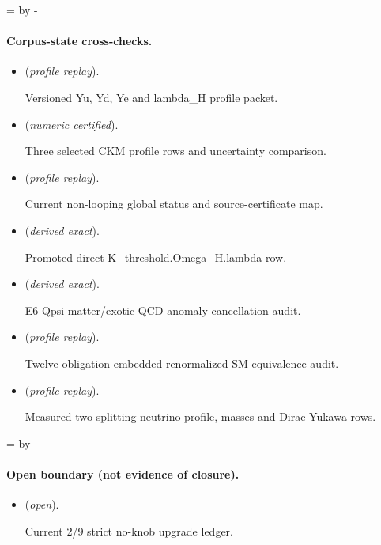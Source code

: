 \documentclass[11pt]{article}
\begin{document}
\par\begingroup{}=\pagegoal\advance{} by -\pagetotal\ifdim\dimen0<7\baselineskip\newpage\fi\endgroup
\paragraph{Corpus-state cross-checks.}
\begin{itemize}
\setlength{\itemsep}{0.25em}
\item {} (\emph{profile replay}).\par Versioned Yu, Yd, Ye and lambda\_H profile packet.
\item {} (\emph{numeric certified}).\par Three selected CKM profile rows and uncertainty comparison.
\item {} (\emph{profile replay}).\par Current non-looping global status and source-certificate map.
\item {} (\emph{derived exact}).\par Promoted direct K\_threshold.Omega\_H.lambda row.
\item {} (\emph{derived exact}).\par E6 Qpsi matter/exotic QCD anomaly cancellation audit.
\item {} (\emph{profile replay}).\par Twelve-obligation embedded renormalized-SM equivalence audit.
\item {} (\emph{profile replay}).\par Measured two-splitting neutrino profile, masses and Dirac Yukawa rows.
\end{itemize}

\par\begingroup{}=\pagegoal\advance{} by -\pagetotal\ifdim\dimen0<7\baselineskip\newpage\fi\endgroup
\paragraph{Open boundary (not evidence of closure).}
\begin{itemize}
\setlength{\itemsep}{0.25em}
\item {} (\emph{open}).\par Current 2/9 strict no-knob upgrade ledger.
\end{itemize}
\end{document}
